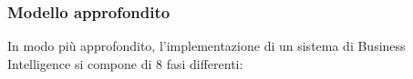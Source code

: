 \subsubsection{Modello approfondito}

In modo più approfondito, l'implementazione di un sistema di Business Intelligence si compone di 8 fasi differenti:\cite{altexsoft_bi_implementation}

